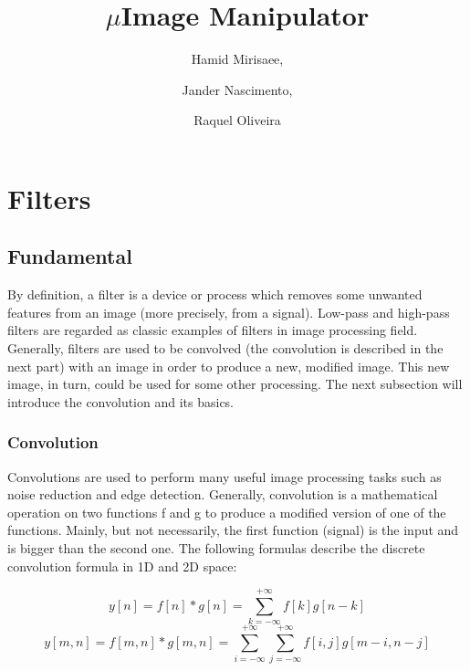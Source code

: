 \documentclass{article}
\begin{document}
\title{$\mu$Image Manipulator}

\author{Hamid Mirisaee,
\and Jander Nascimento, 
\and Raquel Oliveira}

\maketitle

\tableofcontents

\section{Filters}

	\subsection{Fundamental}

		By definition, a filter is a device or process which removes some unwanted features from an image (more precisely, from a signal).
		Low-pass and high-pass filters are regarded as  classic examples of filters in image processing field. Generally, filters are used to be convolved 
		(the convolution is described in the next part) with an image in order to produce a new, modified image. This new image, in turn, could
		be used for some other processing. The next subsection will introduce the convolution and its basics.
		
		\subsubsection{Convolution}

			Convolutions are used to perform many useful image processing tasks such as noise reduction and edge detection. Generally,
			convolution is a mathematical operation on two functions f and g to produce a modified version of one of the functions.
			Mainly, but not necessarily, the first function (signal) is the input and is bigger than the second one.
			The following formulas describe the discrete convolution formula in 1D and 2D space:

			\begin{equation}
			y[n] = f[n]*g[n] = \sum_{k=-\infty}^{+\infty} f[k]g[n-k]
			\end{equation}
			\begin{equation}
			y[m,n] = f[m,n]*g[m,n] = \sum_{i=-\infty}^{+\infty}\sum_{j=-\infty}^{+\infty}f[i,j]g[m-i,n-j]
			\end{equation}
\end{document}
